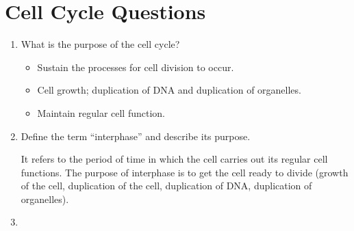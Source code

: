 \documentclass[12pt]{report}
\begin{document}
\section{Cell Cycle Questions}
\begin{enumerate}
\setlength\itemsep{1em}
    \item{What is the purpose of the cell cycle?}
        \begin{solution}
            \invis
            \begin{itemize}
                \item{Sustain the processes for cell division to occur.}
                \item{Cell growth; duplication of DNA and duplication of organelles.}
                \item{Maintain regular cell function.}
            \end{itemize}
        \end{solution}

    \item{Define the term ``interphase'' and describe its purpose.}
        \begin{solution}
            It refers to the period of time in which the cell carries out its regular cell functions. The purpose of interphase is to get the cell ready to divide (growth of the cell, duplication of the cell, duplication of DNA, duplication of organelles).
        \end{solution}

    \item{
        }


\end{enumerate}
\end{document}
